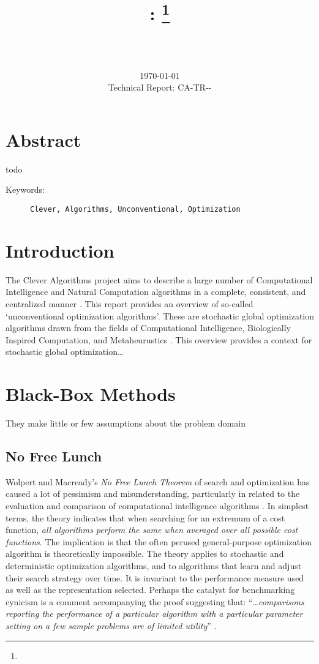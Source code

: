 \documentclass[a4paper, 11pt]{article}
\title{{\myreporttitle}: {\myreportsubtitle}\footnote{\myreportlicense}}
\author{\myreportauthor\\{\myreportemail}\\\small\myreportproject}
\date{\today\\{\small{Technical Report: CA-TR-{\myreportdate}-\myreportversion}}}
\begin{document}
\maketitle

\section*{Abstract} 
todo

\begin{description}
	\item[Keywords:] {\small\texttt{Clever, Algorithms, Unconventional, Optimization}}
\end{description} 

\section{Introduction}
\label{sec:introduction}
The Clever Algorithms project aims to describe a large number of Computational Intelligence and Natural Computation algorithms in a complete, consistent, and centralized manner \cite{Brownlee2010}.
This report provides an overview of so-called `unconventional optimization algorithms'. These are stochastic global optimization algorithms drawn from the fields of Computational Intelligence, Biologically Inspired Computation, and Metaheurustics \cite{Brownlee2010c}.
This overview provides a context for stochastic global optimization\ldots


% 
% 
\section{Black-Box Methods}
\label{sec:black_box}
They make little or few assumptions about the problem domain


% 
% 
\subsection{No Free Lunch}

Wolpert and Macready's \emph{No Free Lunch Theorem} of search and optimization has caused a lot of pessimism and misunderstanding, particularly in related to the evaluation and comparison of computational intelligence algorithms \cite{Wolpert1997, Wolpert1995}. In simplest terms, the theory indicates that when searching for an extremum of a cost function, \emph{all algorithms perform the same when averaged over all possible cost functions}. The implication is that the often perused general-purpose optimization algorithm is theoretically impossible. The theory applies to stochastic and deterministic optimization algorithms, and to algorithms that learn and adjust their search strategy over time. It is invariant to the performance measure used as well as the representation selected. Perhaps the catalyst for benchmarking cynicism is a comment accompanying the proof suggesting that: ``\ldots \emph{comparisons reporting the performance of a particular algorithm with a particular parameter setting on a few sample problems are of limited utility}'' \cite{Wolpert1997}.
\end{document}
